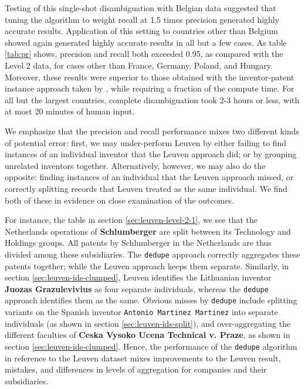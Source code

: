 \documentclass[11pt]{article}
\begin{document}
Testing of this single-shot disambiguation with Belgian data suggested
that tuning the algorithm to weight recall at 1.5 times precision
generated highly accurate results. Application of this setting to
countries other than Belgium showed again generated highly accurate
results in all
but a few cases. As table \ref{tab:pr} shows, precision and recall both
exceeded 0.95, as compared with the Level 2 data, for cases other than France, Germany, Poland, and
Hungary. Moreover, these results were
superior to those obtained with the inventor-patent instance approach
taken by \cite{lai2011disambiguation}, while requiring a fraction of
the compute time. For all but the largest countries, complete disambiguation took 2-3
hours or less, with at most 20 minutes of human input.

We emphasize that the precision and recall performance mixes two
different kinds of potential error: first, we may under-perform Leuven
by either failing to find instances of an individual inventor that the
Leuven approach did; or by grouping unrelated inventors
together. Alternatively, however, we may also do the opposite: finding
instances of an individual that the Leuven approach missed, or
correctly splitting records that Leuven treated as the same
individual. We find both of these in evidence on close examination of
the outcomes. 

For instance, the table in section \ref{sec:leuven-level-2-1}, we see
that the Netherlands operations of \textbf{Schlumberger} are split
between its Technology and Holdings groups. All patents by
Schlumberger in the Netherlands are thus divided among these
subsidiaries. The \texttt{dedupe} approach correctly aggregates these
patents together; while the Leuven approach keeps them separate.
Similarly, in section \ref{sec:leuven-ids-clumped}, Leuven identifies
the Lithuanian inventor \textbf{Juozas Grazulevivius} as four separate
individuals, whereas the \texttt{dedupe} approach identifies them as
the same. Obvious misses by \texttt{dedupe} include splitting variants
on the Spanish inventor \texttt{Antonio Martinez Martinez} into
separate individuals (as shown in section \ref{sec:leuven-ids-split}),
and over-aggregating the different faculties of \textbf{Ceska Vysoko
Ucena Technical v. Praze}, as shown in section
\ref{sec:leuven-ids-clumped}. Hence, the performance of the
\texttt{dedupe} algorithm in reference to the Leuven dataset mixes
improvements to the Leuven result, mistakes, and differences in levels
of aggregation for companies and their subsidiaries. 
\end{document}
